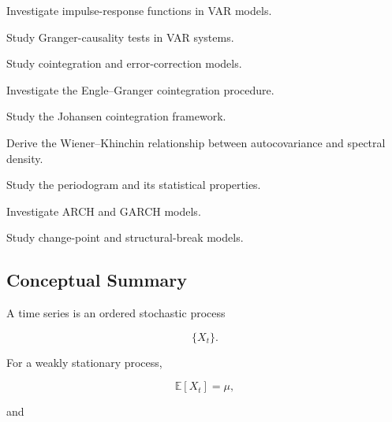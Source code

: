 \begin{exercise}[4]
Investigate impulse-response functions in VAR models.
\end{exercise}

\begin{exercise}[4]
Study Granger-causality tests in VAR systems.
\end{exercise}

\begin{exercise}[4]
Study cointegration and error-correction models.
\end{exercise}

\begin{exercise}[4]
Investigate the Engle--Granger cointegration procedure.
\end{exercise}

\begin{exercise}[4]
Study the Johansen cointegration framework.
\end{exercise}

\begin{exercise}[4]
Derive the Wiener--Khinchin relationship between autocovariance and
spectral density.
\end{exercise}

\begin{exercise}[4]
Study the periodogram and its statistical properties.
\end{exercise}

\begin{exercise}[4]
Investigate ARCH and GARCH models.
\end{exercise}

\begin{exercise}[4]
Study change-point and structural-break models.
\end{exercise}

\subsection{Conceptual Summary}
\label{subsec:time-series-summary}

A time series is an ordered stochastic process

\[
\boxed{
\{X_t\}.
}
\]

For a weakly stationary process,

\[
\boxed{
\mathbb{E}[X_t]=\mu,
}
\]

and

